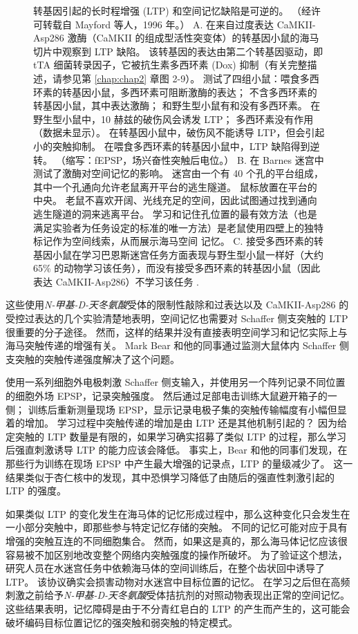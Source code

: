 \begin{figure}[htbp]
	\caption{转基因引起的长时程增强 (LTP) 和空间记忆缺陷是可逆的。 （经许可转载自 Mayford 等人，1996 年。） A. 在来自过度表达 CaMKII-Asp286 激酶（CaMKII 的组成型活性突变体）的转基因小鼠的海马切片中观察到 LTP 缺陷。 该转基因的表达由第二个转基因驱动，即 tTA 细菌转录因子，它被抗生素多西环素 (Dox) 抑制（有关完整描述，请参见第 \ref{chap:chap2} 章图 2-9）。 测试了四组小鼠：喂食多西环素的转基因小鼠，多西环素可阻断激酶的表达； 不含多西环素的转基因小鼠，其中表达激酶； 和野生型小鼠有和没有多西环素。 在野生型小鼠中，10 赫兹的破伤风会诱发 LTP； 多西环素没有作用（数据未显示）。 在转基因小鼠中，破伤风不能诱导 LTP，但会引起小的突触抑制。 在喂食多西环素的转基因小鼠中，LTP 缺陷得到逆转。 （缩写：fEPSP，场兴奋性突触后电位。） B. 在 Barnes 迷宫中测试了激酶对空间记忆的影响。 迷宫由一个有 40 个孔的平台组成，其中一个孔通向允许老鼠离开平台的逃生隧道。 鼠标放置在平台的中央。 老鼠不喜欢开阔、光线充足的空间，因此试图通过找到通向逃生隧道的洞来逃离平台。 学习和记住孔位置的最有效方法（也是满足实验者为任务设定的标准的唯一方法）是老鼠使用四壁上的独特标记作为空间线索，从而展示海马空间 记忆。 C. 接受多西环素的转基因小鼠在学习巴恩斯迷宫任务方面表现与野生型小鼠一样好（大约 65\% 的动物学习该任务），而没有接受多西环素的转基因小鼠（因此表达 CaMKII-Asp286）不学习该任务 .}
	\label{fig:54_9}
\end{figure}


这些使用\textit{N-甲基-D-天冬氨酸}受体的限制性敲除和过表达以及 CaMKII-Asp286 的受控过表达的几个实验清楚地表明，空间记忆也需要对 Schaffer 侧支突触的 LTP 很重要的分子途径。
然而，这样的结果并没有直接表明空间学习和记忆实际上与海马突触传递的增强有关。
Mark Bear 和他的同事通过监测大鼠体内 Schaffer 侧支突触的突触传递强度解决了这个问题。


使用一系列细胞外电极刺激 Schaffer 侧支输入，并使用另一个阵列记录不同位置的细胞外场 EPSP，记录突触强度。
然后通过足部电击训练大鼠避开箱子的一侧；
训练后重新测量现场 EPSP，显示记录电极子集的突触传输幅度有小幅但显着的增加。
学习过程中突触传递的增加是由 LTP 还是其他机制引起的？
因为给定突触的 LTP 数量是有限的，如果学习确实招募了类似 LTP 的过程，那么学习后强直刺激诱导 LTP 的能力应该会降低。
事实上，Bear 和他的同事们发现，在那些行为训练在现场 EPSP 中产生最大增强的记录点，LTP 的量级减少了。
这一结果类似于杏仁核中的发现，其中恐惧学习降低了由随后的强直性刺激引起的 LTP 的强度。


如果类似 LTP 的变化发生在海马体的记忆形成过程中，那么这种变化只会发生在一小部分突触中，即那些参与特定记忆存储的突触。
不同的记忆可能对应于具有增强的突触互连的不同细胞集合。
然而，如果这是真的，那么海马体记忆应该很容易被不加区别地改变整个网络内突触强度的操作所破坏。
为了验证这个想法，研究人员在水迷宫任务中依赖海马体的空间训练后，在整个齿状回中诱导了 LTP。
该协议确实会损害动物对水迷宫中目标位置的记忆。
在学习之后但在高频刺激之前给予\textit{N-甲基-D-天冬氨酸}受体拮抗剂的对照动物表现出正常的空间记忆。
这些结果表明，记忆障碍是由于不分青红皂白的 LTP 的产生而产生的，这可能会破坏编码目标位置记忆的强突触和弱突触的特定模式。


